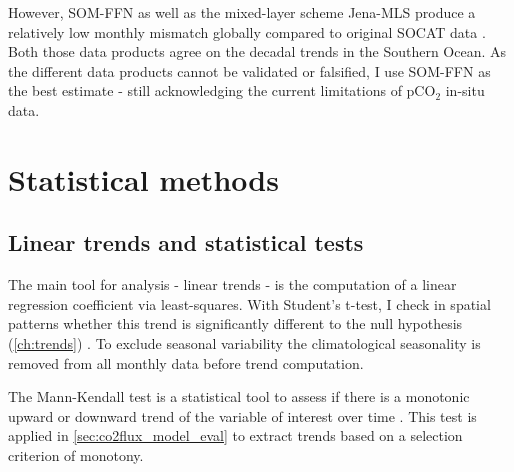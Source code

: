 However, \acs{SOM-FFN} as well as the mixed-layer scheme Jena-MLS \citep{Roedenbeck2013,Roedenbeck2014} produce a relatively low monthly mismatch globally compared to original \acs{SOCAT} data \citep{Roedenbeck2015}. Both those data products agree on the decadal trends in the Southern Ocean. As the different data products cannot be validated or falsified, I use \acs{SOM-FFN} as the best estimate - still acknowledging the current limitations of pCO$_2$ in-situ data.






\section{Statistical methods}

\subsection{Linear trends and statistical tests}
The main tool for analysis - linear trends - is the computation of a linear regression coefficient via least-squares. With Student's t-test, I check in spatial patterns whether this trend is significantly different to the null hypothesis (\autoref{ch:trends}) \citep{Mood1974}. To exclude seasonal variability the climatological seasonality is removed from all monthly data before trend computation. \newline


The Mann-Kendall test is a statistical tool to assess if there is a monotonic upward or downward trend of the variable of interest over time \citep{Mann1945,Kendall1975}. This test is applied in \autoref{sec:co2flux_model_eval} to extract trends based on a selection criterion of monotony.


